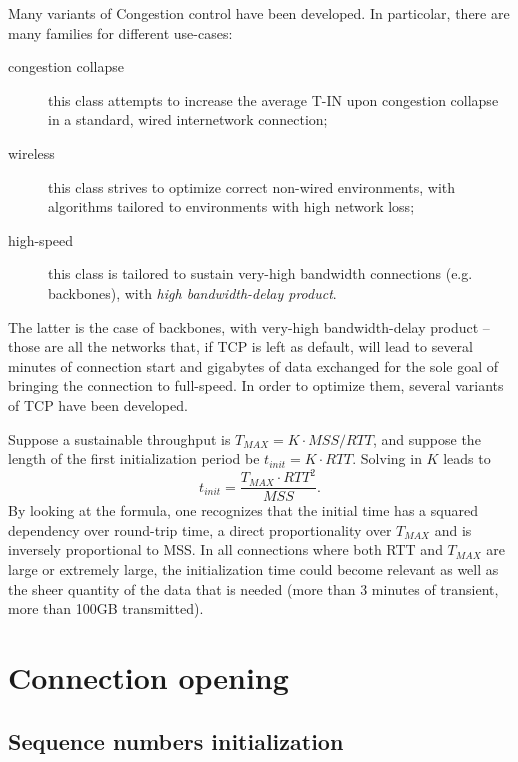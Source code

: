 \documentclass[10pt]{book}
\begin{document}
Many variants of Congestion control have been developed. In particolar, there
are many families for different use-cases:
\begin{description}
    \item[congestion collapse] this class attempts to increase the average T-IN
        upon congestion collapse in a standard, wired internetwork connection;
    \item[wireless] this class strives to optimize correct non-wired environments, with algorithms tailored to environments with high network loss;
    \item [high-speed] this class is tailored to sustain very-high bandwidth
        connections (e.g. backbones), with \emph{high bandwidth-delay product}.
\end{description}


The latter is the case of backbones, with very-high bandwidth-delay product
\--- those are all the networks that, if TCP is left as default, will lead to
several minutes of connection start and gigabytes of data exchanged for the
sole goal of bringing the connection to full-speed. In order to optimize them,
several variants of TCP have been developed.

Suppose a sustainable throughput is $T_{MAX} = K \cdot MSS / RTT$, and suppose
the length of the first initialization period be $t_{init} = K \cdot RTT$.
Solving in $K$ leads to $$t_{init} = \frac{T_{MAX} \cdot RTT^2}{MSS}.$$ By
looking at the formula, one recognizes that the initial time has a squared
dependency over round-trip time, a direct proportionality over $T_{MAX}$ and is
inversely proportional to MSS. In all connections where both RTT and $T_{MAX}$
are large or extremely large, the initialization time could become relevant as
well as the sheer quantity of the data that is needed (more than $3$ minutes of
transient, more than 100GB transmitted).


\chapter{Connection opening}

\section{Sequence numbers initialization}
\end{document}
